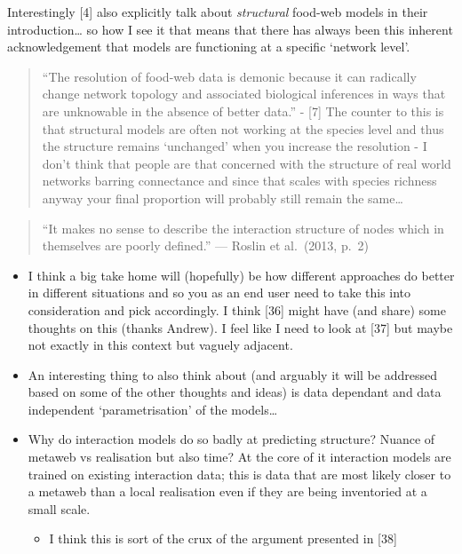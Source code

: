 \documentclass[
]{article}
\providecommand{\tightlist}{%
  \setlength{\itemsep}{0pt}\setlength{\parskip}{0pt}}\usepackage{longtable,booktabs,array}
\begin{document}
Interestingly {[}4{]} also explicitly talk about \emph{structural}
food-web models in their introduction\ldots{} so how I see it that means
that there has always been this inherent acknowledgement that models are
functioning at a specific `network level'.

\begin{quote}
``The resolution of food-web data is demonic because it can radically
change network topology and associated biological inferences in ways
that are unknowable in the absence of better data.'' - {[}7{]} The
counter to this is that structural models are often not working at the
species level and thus the structure remains `unchanged' when you
increase the resolution - I don't think that people are that concerned
with the structure of real world networks barring connectance and since
that scales with species richness anyway your final proportion will
probably still remain the same\ldots{}
\end{quote}

\begin{quote}
``It makes no sense to describe the interaction structure of nodes which
in themselves are poorly defined.'' --- Roslin et al.~(2013, p.~2)
\end{quote}

\begin{itemize}
\item
  I think a big take home will (hopefully) be how different approaches
  do better in different situations and so you as an end user need to
  take this into consideration and pick accordingly. I think {[}36{]}
  might have (and share) some thoughts on this (thanks Andrew). I feel
  like I need to look at {[}37{]} but maybe not exactly in this context
  but vaguely adjacent.
\item
  An interesting thing to also think about (and arguably it will be
  addressed based on some of the other thoughts and ideas) is data
  dependant and data independent `parametrisation' of the models\ldots{}
\item
  Why do interaction models do so badly at predicting structure? Nuance
  of metaweb vs realisation but also time? At the core of it interaction
  models are trained on existing interaction data; this is data that are
  most likely closer to a metaweb than a local realisation even if they
  are being inventoried at a small scale.

  \begin{itemize}
  \tightlist
  \item
    I think this is sort of the crux of the argument presented in
    {[}38{]}
  \end{itemize}
\end{itemize}
\end{document}
